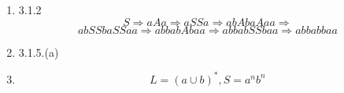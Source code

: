 \documentclass[10pt,a4paper]{article}
\begin{document}
\begin{enumerate}
	\item 3.1.2
	\[ S\Rightarrow aAa\Rightarrow aSSa\Rightarrow abAbaAaa\Rightarrow \]
	\[ abSSbaSSaa\Rightarrow abbabAbaa\Rightarrow abbabSSbaa\Rightarrow abbabbaa \]
	\item 3.1.5.(a)
	
	\item \par
	\[ L=(a\cup b)^*,S={a^nb^n} \]
\end{enumerate}
\end{document}
